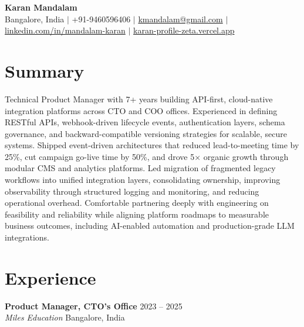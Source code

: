 \documentclass[10pt, a4paper]{article}
\begin{document}
\begin{center}
{\LARGE \textbf{Karan Mandalam}} \\[2pt]
{\small Bangalore, India $|$ +91-9460596406 $|$ \href{mailto:kmandalam@gmail.com}{kmandalam@gmail.com} $|$ \href{https://linkedin.com/in/mandalam-karan}{linkedin.com/in/mandalam-karan} $|$ \href{https://karan-profile-zeta.vercel.app}{karan-profile-zeta.vercel.app}}
\end{center}

\vspace*{-1.5em}

\section*{Summary}
\vspace{-0.1em}
{\small Technical Product Manager with 7+ years building API-first, cloud-native integration platforms across CTO and COO offices. Experienced in defining RESTful APIs, webhook-driven lifecycle events, authentication layers, schema governance, and backward-compatible versioning strategies for scalable, secure systems. Shipped event-driven architectures that reduced lead-to-meeting time by 25\%, cut campaign go-live time by 50\%, and drove 5$\times$ organic growth through modular CMS and analytics platforms. Led migration of fragmented legacy workflows into unified integration layers, consolidating ownership, improving observability through structured logging and monitoring, and reducing operational overhead. Comfortable partnering deeply with engineering on feasibility and reliability while aligning platform roadmaps to measurable business outcomes, including AI-enabled automation and production-grade LLM integrations.\par}

\section*{Experience}
\vspace{-0.1em}

{\small \textbf{Product Manager, CTO's Office} \hfill 2023 -- 2025 \\
\textit{Miles Education} \hfill Bangalore, India}
\end{document}
